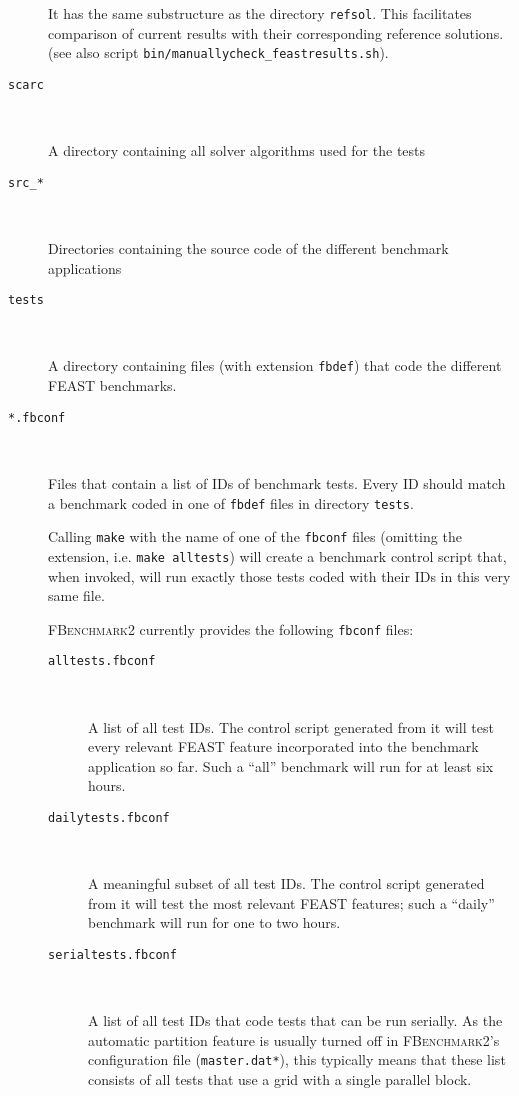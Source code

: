 \begin{description}
  It has the same substructure as the directory \texttt{refsol}. This
  facilitates comparison of current results with their corresponding reference solutions.
  (see also script \texttt{bin/manuallycheck\_feastresults.sh}).

\item[\texttt{scarc}] \

  A directory containing all solver algorithms used for the tests

\item[\texttt{src\_*}] \

  Directories containing the source code of the different benchmark applications

\item[\texttt{tests}] \

  A directory containing files (with extension \texttt{fbdef}) that code
  the different FEAST benchmarks.

\item[\texttt{*.fbconf}] \

  Files that contain a list of IDs of benchmark tests. Every ID should match
  a benchmark coded in one of \texttt{fbdef} files in directory \texttt{tests}.

  Calling \texttt{make} with the name of one of the \texttt{fbconf} files
  (omitting the extension, i.e. \texttt{make alltests}) will
  create a benchmark control script that, when invoked, will run exactly those
  tests coded with their IDs in this very same file.

  \textsc{FBenchmark2} currently provides the following \texttt{fbconf} files:
  \begin{description}
  \item[\texttt{alltests.fbconf}] \

    A list of all test IDs. The control script generated from it
    will test every relevant FEAST feature incorporated into the benchmark
    application so far. Such a ``all'' benchmark will
    run for at least six hours.

  \item[\texttt{dailytests.fbconf}] \

    A meaningful subset of all test IDs. The control script generated from it
    will test the most relevant FEAST features; such a ``daily'' benchmark will
    run for one to two hours.

  \item[\texttt{serialtests.fbconf}] \

    A list of all test IDs that code tests that can be run serially. As the
    automatic partition feature is usually turned off in \textsc{FBenchmark2}'s
    configuration file (\texttt{master.dat*}), this typically means that these
    list consists of all tests that use a grid with a single parallel block.


\end{description}
\end{description}
